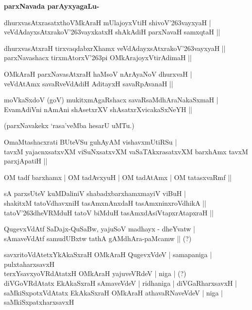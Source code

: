 {\bigskip
\noindent
{\large\bf parxNavada parAyxyagaLu-}}
\begin{itemize}
{\bf 
\item[1.] dhurxvasAtxrasatxthoVMkAraH mUlajoyxVtiH shivoV\char'263vayxyaH |\\\label{155c}
veVdAdayxsAtxrakoV\char'263vayxkatxH shAkAdiH parxNavaH samxqtaH ||
\item[2.] dhurxvasAtxraH tirxvaqdabxrXhamx veVdAdayxsAtxrakoV\char'263vayxyaH ||\\\label{155d}
parxNavashacx tirxmAtorxV\char'263pi OMkArajoyxVtirAdimaH ||
\item[3.] OMkAraH parxNavasAtxraH haMsoV nArAyaNoV dhurxvaH |\\\label{155e}
veVdAtAmx savaRveVdAdiH AditayxH savaRpAvanaH ||
\item[4.] moVkaSxdoV (goV) mukitxmAgaRshacx savaRsaMdhAraNakaSxmaH |\\
EvamAdiVni nAmAni shAsetxrXV shAsatxrXvicakaSxNeYH ||}
\end{itemize}
(parxNavakekx `rasa'veMba hesarU uMTu.)
\begin{itemize}
{\bf 
\item[5.] OmaMtashacxrati BUteVSu guhAyAM vishavxmUtiRSu |\\\label{156}
tavxM yajacnxsatxvXM viSuNxsatxvXM vaSaTAkxrasatxvXM barxhAmx tavxM parxjApatiH ||
\item[6.] OM tadf barxhamx | OM tadAvxyuH | OM tadAtAmx | OM tatasxvaRmf ||\label{156a}
\item[7.] sA parxsUteV kuMDaliniV shabadxbarxhamxmayiV viBuH |\\
shakitxM tatoVdhavxniH tasAmxnAnxdaH tasAmxninxroVdhikA ||\\
tatoV\char'263dheVRMduH tatoV biMduH tasAmxdAsiVtapxrAtapxraH ||
\item[8.] QugevxVdAtf SaDajx-QuSaBw, yajuSoV madhayx - dheYvatw |\\\label{156b}
sAmaveVdAtf samudUBxtw tathA gAMdhAra-paMcamw || (?)
\item[9.] savxritoVdAtetxYkAkaSxraH\label{156c} OMkAraH QugevxVdeV | samapaniga | pulxtaharxsavxH \\
terxYsavxyoVRdAtatxH OMkAraH yajuveVRdeV | niga | (?)\\
diVGoVRdAtatx EkAkaSxraH sAmaveVdeV | ridhaniga | diVGaRharxsavxH |\\
saMkiSxpotxVdAtatx EkAkaSxraH OMkAraH athavaRNaveVdeV | niga |\\
saMkiSxpatxharxsavxH}
\end{itemize}

